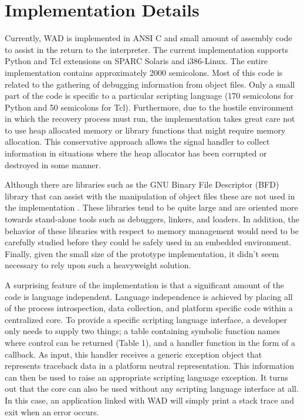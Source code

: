 \section{Implementation Details}

Currently, WAD is implemented in ANSI C and small amount of assembly
code to assist in the return to the interpreter.  The current
implementation supports Python and Tcl extensions on SPARC Solaris and
i386-Linux. The entire implementation contains approximately 2000
semicolons. Most of this code is related to the gathering of
debugging information from object files.  Only a small part of the
code is specific to a particular scripting language (170 semicolons for Python
and 50 semicolons for Tcl). Furthermore, due to the
hostile environment in which the recovery process must run, the
implementation takes great care not to use heap allocated memory or
library functions that might require memory allocation.  This
conservative approach allows the signal handler to collect information
in situations where the heap allocator has been corrupted or destroyed
in some manner.

Although there are libraries such as the GNU Binary File Descriptor
(BFD) library that can assist with the manipulation of object files
these are not used in the implementation \cite{bfd}.  These
libraries tend to be quite large and are oriented more towards
stand-alone tools such as debuggers, linkers, and loaders.  In addition,
the behavior of these libraries with respect to memory management
would need to be carefully studied before they could be safely used in
an embedded environment. Finally, given the small size of the prototype 
implementation, it didn't seem necessary to rely upon such a 
heavyweight solution.

A surprising feature of the implementation is that a significant
amount of the code is language independent.  Language
independence is achieved by placing all of the process introspection,
data collection, and platform specific code within a centralized core.
To provide a specific scripting language interface, a developer
only needs to supply two things; a table containing symbolic function
names where control can be returned (Table 1), and a 
handler function in the form of a callback.  As input, this handler
receives a generic exception object that represents traceback data
in a platform neutral representation.  This information can then be used to raise
an appropriate scripting language exception.  It turns out that the core
can also be used without any scripting language interface at all.  In this case,
an application linked with WAD will simply print a stack trace and exit when
an error occurs.

